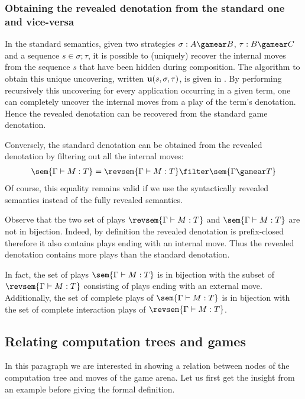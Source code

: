 \subsubsection{Obtaining the revealed denotation from the standard one and vice-versa}
\label{subsec:relating_revealed_and_standard_denotation}

In the standard semantics, given two strategies $\sigma : A
\gamear B$, $\tau : B \gamear C$ and a sequence $s \in
\sigma ; \tau$, it is possible to (uniquely) recover the
internal moves from the sequence $s$ that have been hidden during composition. The algorithm to obtain this unique uncovering, written ${\bf u}(s, \sigma, \tau)$, is given in \cite[part II]{hylandong_pcf}. By performing recursively this uncovering for every application occurring in a given term, one can completely uncover the internal moves from a play of the term's denotation.
Hence the revealed denotation can be recovered from the standard game denotation.

Conversely, the standard denotation can be obtained from the revealed denotation by filtering out all the internal moves:
\begin{eqnarray}
 \sem{\Gamma \vdash M : T} = \revsem{\Gamma \vdash M : T} \filter \sem{\Gamma \gamear T} \label{eqn:int_std_gamsem}
\end{eqnarray}
Of course, this equality remains valid if we use the syntactically revealed semantics instead of the fully revealed semantics.


Observe that the two set of plays $\revsem{\Gamma \vdash M : T}$ and $\sem{\Gamma \vdash M : T}$ are not in bijection.  Indeed, by definition the revealed denotation is prefix-closed therefore it also contains plays ending with an internal move. Thus the revealed denotation contains more plays than the standard denotation.

In fact, the set of plays $\sem{\Gamma \vdash M : T}$ is in bijection with the subset of $\revsem{\Gamma \vdash M : T}$ consisting of plays ending with an external move. Additionally, the set of complete plays of $\sem{\Gamma \vdash M : T}$ is in bijection with the set of complete interaction plays of $\revsem{\Gamma \vdash M : T}$.


\subsection{Relating computation trees and games}
In this paragraph we are interested in showing a relation between nodes of the computation tree and moves of the game arena.
Let us first get the insight from an example before giving the formal definition.
